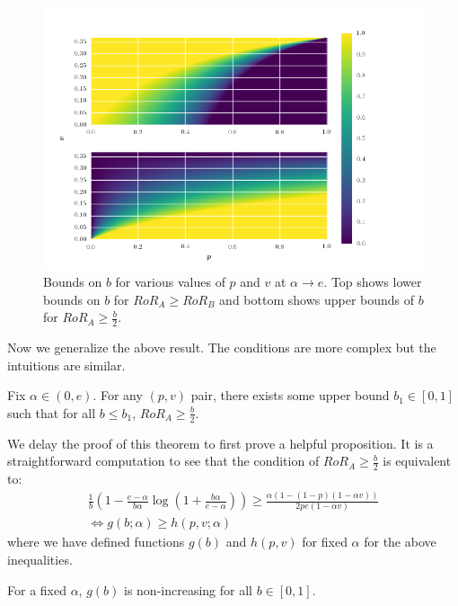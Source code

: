 \begin{figure}[h!]
\begin{centering}
\includegraphics[scale = 0.75]{./figures/b_bounds.png}
\caption{Bounds on $b$ for various values of $p$ and $v$ at $\alpha \rightarrow e$. Top shows lower bounds on $b$ for $RoR_A \geq RoR_B$ and bottom shows upper bounds of $b$ for $RoR_A \geq \frac{b}{2}$.}
\label{fig:b_restrictions}
\end{centering}
\end{figure}

Now we generalize the above result. The conditions are more complex but the intuitions are similar. 

\begin{lemma}
Fix $\alpha \in (0, e)$. For any $(p,v)$ pair, there exists some upper bound $b_1 \in [0,1]$ such that for all $b \leq b_1$, $RoR_A \geq \frac{b}{2}$.
\end{lemma}

We delay the proof of this theorem to first prove a helpful proposition. It is a straightforward computation to see that the condition of $RoR_A \geq \frac{b}{2}$ is equivalent to:
\begin{gather*}
\frac{1}{b}\left(1-\frac{e-\alpha}{b\alpha}\log \left(1+\frac{b\alpha}{e-\alpha} \right) \right) \geq \frac{\alpha(1-(1-p)(1-\alpha v))}{2pe(1-\alpha v)} \\
\iff
g(b; \alpha) \geq h(p, v; \alpha)
\end{gather*}
where we have defined functions $g(b)$ and $h(p,v)$ for fixed $\alpha$ for the above inequalities. 

\begin{proposition}
For a fixed $\alpha$, $g(b)$ is non-increasing for all $b \in [0,1]$. 
\end{proposition}

